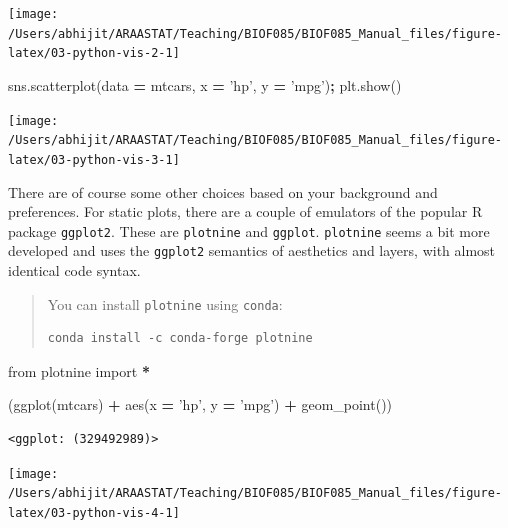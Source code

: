 \documentclass[
  letterpaper,
]{scrbook}
\newenvironment{Shaded}{\begin{snugshade}}{\end{snugshade}}
\newcommand{\ImportTok}[1]{#1}
\newcommand{\NormalTok}[1]{#1}
\newcommand{\OperatorTok}[1]{\textcolor[rgb]{0.81,0.36,0.00}{\textbf{#1}}}
\newcommand{\StringTok}[1]{\textcolor[rgb]{0.31,0.60,0.02}{#1}}
\begin{document}
\begin{center}\texttt{[image: /Users/abhijit/ARAASTAT/Teaching/BIOF085/BIOF085\_Manual\_files/figure-latex/03-python-vis-2-1]} \end{center}

\begin{Shaded}
\begin{Highlighting}[]
\NormalTok{sns.scatterplot(data }\OperatorTok{=}\NormalTok{ mtcars, x }\OperatorTok{=} \StringTok{'hp'}\NormalTok{, y }\OperatorTok{=} \StringTok{'mpg'}\NormalTok{)}\OperatorTok{;}
\NormalTok{plt.show()}
\end{Highlighting}
\end{Shaded}

\begin{center}\texttt{[image: /Users/abhijit/ARAASTAT/Teaching/BIOF085/BIOF085\_Manual\_files/figure-latex/03-python-vis-3-1]} \end{center}

There are of course some other choices based on your background and preferences. For static plots, there are a couple of emulators of the popular R package \texttt{ggplot2}. These are \texttt{plotnine} and \texttt{ggplot}. \texttt{plotnine} seems a bit more developed and uses the \texttt{ggplot2} semantics of aesthetics and layers, with almost identical code syntax.

\begin{quote}
You can install \texttt{plotnine} using \texttt{conda}:

\begin{verbatim}
conda install -c conda-forge plotnine
\end{verbatim}
\end{quote}

\begin{Shaded}
\begin{Highlighting}[]
\ImportTok{from}\NormalTok{ plotnine }\ImportTok{import} \OperatorTok{*}

\NormalTok{(ggplot(mtcars) }\OperatorTok{+} 
\NormalTok{  aes(x }\OperatorTok{=} \StringTok{'hp'}\NormalTok{, y }\OperatorTok{=} \StringTok{'mpg'}\NormalTok{) }\OperatorTok{+}
\NormalTok{  geom_point())}
\end{Highlighting}
\end{Shaded}

\begin{verbatim}
<ggplot: (329492989)>
\end{verbatim}

\begin{center}\texttt{[image: /Users/abhijit/ARAASTAT/Teaching/BIOF085/BIOF085\_Manual\_files/figure-latex/03-python-vis-4-1]} \end{center}
\end{document}
